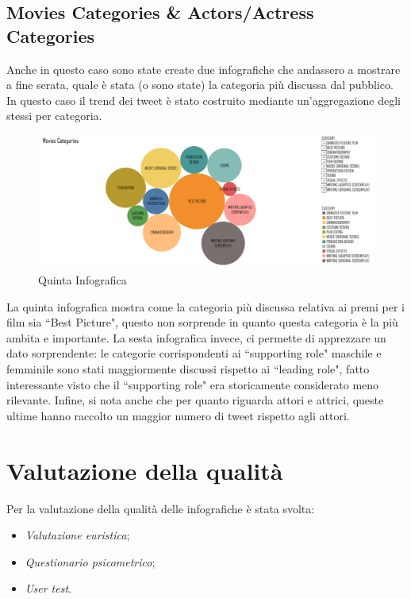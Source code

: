 \newpage
\section{Movies Categories \& Actors/Actress Categories}
Anche in questo caso sono state create due infografiche che andassero a mostrare a fine serata, quale è stata (o sono state) la categoria più discussa dal pubblico. In questo caso il trend dei tweet è stato costruito mediante un'aggregazione degli stessi per categoria. 

	\begin{figure}[h]
			\centering
			\includegraphics[width=1\linewidth]{imgs/Infografica5OKOK.png}
			\caption{Quinta Infografica}
			\label{fig:Terza infografica}
		\end{figure}
		
La quinta infografica mostra come la categoria più discussa relativa ai premi per i film sia “Best Picture", questo non sorprende in quanto questa categoria è la più ambita e importante.
La sesta infografica invece, ci permette di apprezzare un dato sorprendente: le categorie corrispondenti ai “supporting role" maschile e femminile sono stati maggiormente discussi rispetto ai “leading role", fatto interessante visto che il “supporting role" era storicamente considerato meno rilevante.
Infine, si nota anche che per quanto riguarda attori e attrici, queste ultime hanno raccolto un maggior numero di tweet rispetto agli attori.

\chapter{Valutazione della qualità}
Per la valutazione della qualità delle infografiche è stata svolta:
\begin{itemize}
 \item \textit{Valutazione euristica};
 \item \textit{Questionario psicometrico};
 \item \textit{User test}.
\end{itemize}

